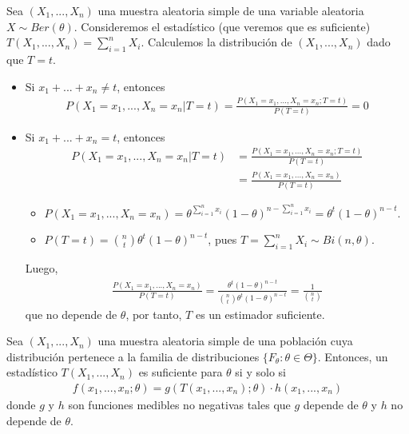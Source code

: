 \begin{ejemplo}
    Sea $(X_1,...,X_n)$ una muestra aleatoria simple de una variable aleatoria $X \sim Ber(\theta)$. Consideremos el estadístico (que veremos que es suficiente) $T(X_1,...,X_n) = \sum_{i=1}^{n}{X_i}$. Calculemos la distribución de $(X_1,...,X_n)$ dado que $T = t$.
    \begin{itemize}
        \item Si $x_1 + ... + x_n \not = t$, entonces
              \begin{align*}
                  P(X_1 = x_1, ..., X_n = x_n | T = t) = \frac{P(X_1 = x_1, ..., X_n = x_n ; T = t)}{P(T = t)} = 0
              \end{align*}
        \item Si $x_1 + ... + x_n = t$, entonces
              \begin{align*}
                  P(X_1 = x_1, ..., X_n = x_n | T = t) & = \frac{P(X_1 = x_1, ..., X_n = x_n ; T = t)}{P(T = t)} \\
                                                       & = \frac{P(X_1 = x_1, ..., X_n = x_n)}{P(T = t)}
              \end{align*}
              \begin{itemize}
                  \item $P(X_1 = x_1, ..., X_n = x_n) = \theta^{\sum_{i=1}^{n}{x_i}}(1-\theta)^{n - \sum_{i=1}^{n}{x_i}} = \theta^{t}(1-\theta)^{n - t}$.
                  \item $P(T = t) = \binom{n}{t}\theta^{t}(1-\theta)^{n - t}$, pues $T = \sum_{i=1}^{n}{X_i} \sim Bi(n,\theta)$.
              \end{itemize}
              Luego,
              \begin{align*}
                  \frac{P(X_1 = x_1, ..., X_n = x_n)}{P(T = t)} = \frac{\theta^{t}(1-\theta)^{n - t}}{\binom{n}{t}\theta^{t}(1-\theta)^{n - t}} = \frac{1}{\binom{n}{t}}
              \end{align*}
              que no depende de $\theta$, por tanto, $T$ es un estimador suficiente.
    \end{itemize}
\end{ejemplo}

\begin{teo}
    Sea $(X_1,...,X_n)$ una muestra aleatoria simple de una población cuya distribución pertenece a la familia de distribuciones $\{F_{\theta} : \theta \in \Theta \}$. Entonces, un estadístico $T(X_1,...,X_n)$ es suficiente para $\theta$ si y solo si
    \begin{align*}
        f(x_1,...,x_n;\theta) = g(T(x_1,...,x_n);\theta) \cdot h(x_1,...,x_n)
    \end{align*}
    donde $g$ y $h$ son funciones medibles no negativas tales que $g$ depende de $\theta$ y $h$ no depende de $\theta$.
\end{teo}

